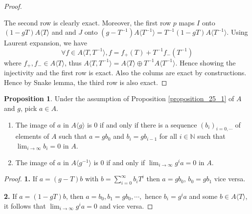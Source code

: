 \documentclass[10pt]{article}
\numberwithin{equation}{section}
\theoremstyle{definition}
\newtheorem{proposition}{Proposition}[subsection]
\newcommand{\N}[0]{\mathbb{N}}
\begin{document}
\begin{proof}
\begin{center}
    \end{center}
    The second row is clearly exact. Moreover, the first row $p$ maps $I$ onto $(1-gT)A\langle T\rangle$ and and $J$ onto $(g-T^{-1})A\langle T^{-1}\rangle = T^{-1}(1-gT)A\langle T^{-1}\rangle$. 
    Using Laurent expansion, we have 
    \begin{equation*}
        \forall f\in A\langle T,T^{-1}\rangle, f= f_+(T)+T^{-1}f_-(T^{-1})
    \end{equation*}
    where $f_+,f_-\in A\langle T\rangle$, thus $A\langle T,T^{-1}\rangle = A\langle T\rangle\oplus T^{-1}A\langle T^{-1}\rangle$. Hence showing the injectivity and the first row is exact. Also the colums are exact by constructions. Hence by Snake lemma, the third row is also exact.
\end{proof}


\begin{proposition}
    \label{fact_26_2}
    Under the assumption of Proposition \ref{proposition_25_1} of $A$ and $g$, pick $a\in A$.
    \begin{enumerate}[1. ]
        \item The image of $a$ in $A\langle g\rangle$ is $0$ if and only if there is a sequence $(b_i)_{i=0,\cdots}$ of elements of $A$ such that $a = gb_0$ and $b_i = gb_{i-1}$ for all $i\in \N$ such that $\lim_{i\to\infty}b_i = 0$ in $A$.
        \item The image of $a$ in $A\langle g^{-1}\rangle$ is $0$ if and only if $\lim_{i\to\infty}g^{i}a=0$ in $A$.
    \end{enumerate}
\end{proposition}
\begin{proof}
\textbf{1.} If $a = (g-T)b$ with $b = \sum_{i=0}^\infty b_iT^i$ then $a = gb_0$, $b_0 = gb_1$ vice versa.
\par\textbf{2.} If $a = (1-gT)b$, then $a=b_0,b_1 = gb_0,\cdots,$ hence $b_i = g^ia$ and some $b\in A\langle T\rangle$, it follows that $\lim_{i\to\infty}g^ia=0$ and vice versa.
\end{proof}
\end{document}
